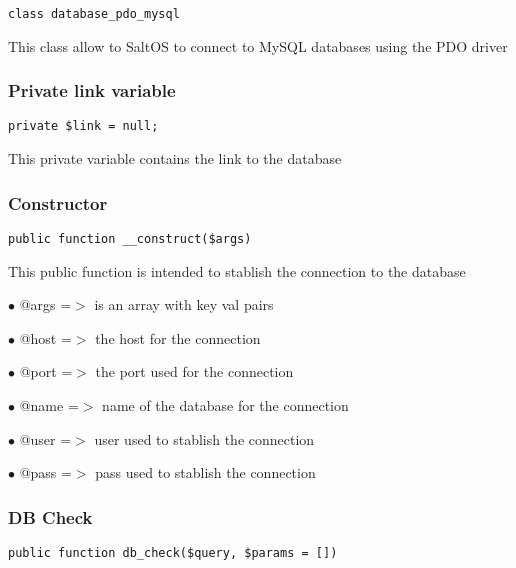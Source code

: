 \documentclass[a4paper]{article}
\begin{document}
\begin{lstlisting}
class database_pdo_mysql
\end{lstlisting}

This class allow to SaltOS to connect to MySQL databases using the PDO driver

\hypertarget{toc338}{}
\subsubsection{Private link variable}

\begin{lstlisting}
private $link = null;
\end{lstlisting}

This private variable contains the link to the database

\hypertarget{toc339}{}
\subsubsection{Constructor}

\begin{lstlisting}
public function __construct($args)
\end{lstlisting}

This public function is intended to stablish the connection to the database

\begin{compactitem}
\item[\color{myblue}$\bullet$] @args =$>$ is an array with key val pairs
\item[\color{myblue}$\bullet$] @host =$>$ the host for the connection
\item[\color{myblue}$\bullet$] @port =$>$ the port used for the connection
\item[\color{myblue}$\bullet$] @name =$>$ name of the database for the connection
\item[\color{myblue}$\bullet$] @user =$>$ user used to stablish the connection
\item[\color{myblue}$\bullet$] @pass =$>$ pass used to stablish the connection
\end{compactitem}

\hypertarget{toc340}{}
\subsubsection{DB Check}

\begin{lstlisting}
public function db_check($query, $params = [])
\end{lstlisting}
\end{document}
